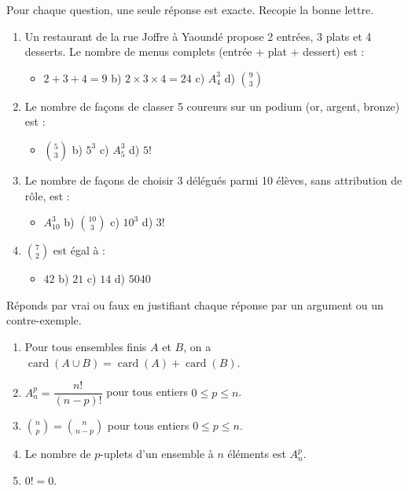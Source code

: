 \documentclass[11pt]{article}
\begin{document}
\begin{exercice}
Pour chaque question, une seule réponse est exacte. Recopie la bonne lettre.
\begin{enumerate}
\item Un restaurant de la rue Joffre à Yaoundé propose 2 entrées, 3 plats et 4 desserts. Le nombre de menus complets (entrée + plat + dessert) est :
\begin{itemize}
\item[a)] $2+3+4=9$ \hfill b) $2\times 3\times 4=24$ \hfill c) $A_4^3$ \hfill d) $\binom{9}{3}$
\end{itemize}
\item Le nombre de façons de classer 5 coureurs sur un podium (or, argent, bronze) est :
\begin{itemize}
\item[a)] $\binom{5}{3}$ \hfill b) $5^3$ \hfill c) $A_5^3$ \hfill d) $5!$
\end{itemize}
\item Le nombre de façons de choisir 3 délégués parmi 10 élèves, sans attribution de rôle, est :
\begin{itemize}
\item[a)] $A_{10}^3$ \hfill b) $\binom{10}{3}$ \hfill c) $10^3$ \hfill d) $3!$
\end{itemize}
\item $\binom{7}{2}$ est égal à :
\begin{itemize}
\item[a)] $42$ \hfill b) $21$ \hfill c) $14$ \hfill d) $5040$
\end{itemize}
\end{enumerate}
\end{exercice}

\begin{exercice}
Réponds par vrai ou faux en justifiant chaque réponse par un argument ou un contre-exemple.
\begin{enumerate}
\item Pour tous ensembles finis $A$ et $B$, on a $\operatorname{card}(A\cup B)=\operatorname{card}(A)+\operatorname{card}(B)$.
\item $A_n^p=\dfrac{n!}{(n-p)!}$ pour tous entiers $0\le p\le n$.
\item $\binom{n}{p}=\binom{n}{n-p}$ pour tous entiers $0\le p\le n$.
\item Le nombre de $p$-uplets d'un ensemble à $n$ éléments est $A_n^p$.
\item $0!=0$.
\end{enumerate}
\end{exercice}
\end{document}
